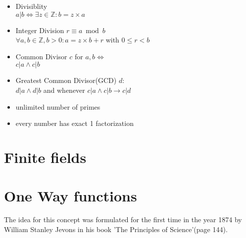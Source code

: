  

\begin{itemize}
 \item Divisiblity
 \\
$a | b \iff \exists z \in \mathbb{Z}: b = z \times a$
 \item Integer Division $r \equiv a \bmod b$ 
 \\
 $ \forall a, b \in \mathbb{Z}, b > 0:  a = z \times b + r $ with $ 0 \leq r < b$
 \item Common Divisor $c$ for $a, b \iff$
 \\
 $c | a \wedge c | b$
 \item Greatest Common Divisor(GCD) $d$:
 \\
 $d | a \wedge d | b$ and whenever $c | a \wedge c | b \rightarrow c | d$
 
 \item unlimited number of primes
 \item every number has exact 1 factorization 
\end{itemize}

\section{Finite fields}

\section{One Way functions}

The idea for this concept was formulated for the first time in the year 1874 by William Stanley Jevons in his book
'The Principles of Science'(page 144).
